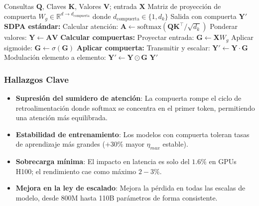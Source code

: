 \documentclass[11pt,a4paper]{article}
\begin{document}
\begin{algorithm}[H]
\caption{Atención Softmax con Compuerta (Post-SDPA)}
\begin{algorithmic}[1]
\Require Consultas $\mathbf{Q}$, Claves $\mathbf{K}$, Valores $\mathbf{V}$; entrada $\mathbf{X}$
\Require Matriz de proyección de compuerta $W_g \in \mathbb{R}^{d \to d_{\text{compuerta}}}$ donde $d_{\text{compuerta}} \in \{1, d_k\}$
\Ensure Salida con compuerta $\mathbf{Y}'$
\State \textbf{SDPA estándar:}
\State Calcular atención: $\mathbf{A} \gets \text{softmax}(\mathbf{Q}\mathbf{K}^\top / \sqrt{d_k})$ 
\State Ponderar valores: $\mathbf{Y} \gets \mathbf{A} \mathbf{V}$
\State \textbf{Calcular compuertas:}
\State Proyectar entrada: $\mathbf{G} \gets \mathbf{X} W_g$  
\State Aplicar sigmoide: $\mathbf{G} \gets \sigma(\mathbf{G})$ 
\State \textbf{Aplicar compuerta:}
    \State Transmitir y escalar: $\mathbf{Y}' \gets \mathbf{Y} \cdot \mathbf{G}$ 
\Else
    \State Modulación elemento a elemento: $\mathbf{Y}' \gets \mathbf{Y} \odot \mathbf{G}$ 
\EndIf
\Return $\mathbf{Y}'$
\end{algorithmic}
\end{algorithm}

\subsubsection{Hallazgos Clave}

\begin{itemize}[leftmargin=*]
    \item \textbf{Supresión del sumidero de atención}: La compuerta rompe el ciclo de retroalimentación donde softmax se concentra en el primer token, permitiendo una atención más equilibrada.
    \item \textbf{Estabilidad de entrenamiento}: Los modelos con compuerta toleran tasas de aprendizaje más grandes ($+30\%$ mayor $\eta_{max}$ estable).
    \item \textbf{Sobrecarga mínima}: El impacto en latencia es solo del $1.6\%$ en GPUs H100; el rendimiento cae como máximo $2-3\%$.
    \item \textbf{Mejora en la ley de escalado}: Mejora la pérdida en todas las escalas de modelo, desde 800M hasta 110B parámetros de forma consistente.
\end{itemize}
\end{document}
